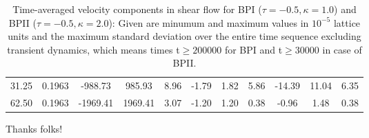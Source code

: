 \documentclass[aps,pre,reprint,superscriptaddress]{revtex4}
\begin{document}
\begin{table}
\begin{tabular}{|c|| c || c |c |c||c| c| c||c| c| c|}
31.25 &0.1963 &-988.73 &985.93 &8.96  &-1.79 &1.82 &5.86 &-14.39 & 11.04 &6.35\\
62.50 &0.1963 & -1969.41  & 1969.41 & 3.07 & -1.20 & 1.20 & 0.38 &-0.96 & 1.48 &0.38 \\
\hline
\end{tabular}
\caption{Time-averaged velocity components in shear flow for BPI ($\tau=-0.5, \kappa=1.0$) and BPII ($\tau=-0.5, \kappa=2.0$): Given are minumum and maximum values in $10^{-5}$ lattice units and the maximum standard deviation over the entire time sequence excluding transient dynamics, which means times t$\ge 200000$ for BPI and t$\ge 30000$ in case of BPII.
\label{tab1}}
\end{table}

\begin{acknowledgments}
Thanks folks!
\end{acknowledgments}


\end{document}
